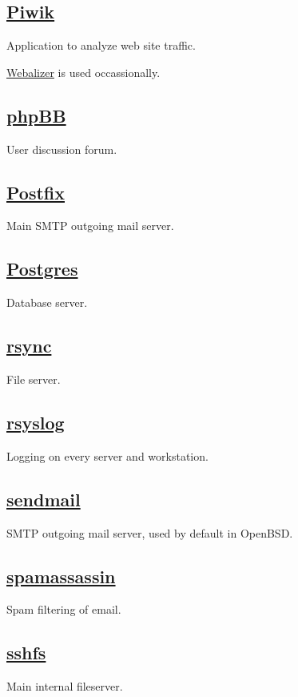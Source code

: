 \subsection{\href{https://www.piwiki.org/}{Piwik}}
Application to analyze web site traffic.

\href{http://www.mrunix.net/webalizer/}{Webalizer} is used occassionally.

\subsection{\href{https://www.phpbb.com/}{phpBB}}
User discussion forum.

\subsection{\href{http://www.postfix.org/}{Postfix}}
Main SMTP outgoing mail server.

\subsection{\href{http://www.postgresql.org/}{Postgres}}
Database server.

\subsection{\href{http://rsync.samba.org/}{rsync}}
File server.

\subsection{\href{http://www.rsyslog.com/}{rsyslog}}
Logging on every server and workstation.

\subsection{\href{http://www.openbsd.org/cgi-bin/man.cgi/OpenBSD-current/man8/sendmail.8?query=sendmail&sec=8}{sendmail}}
SMTP outgoing mail server, used by default in OpenBSD.

\subsection{\href{http://www.spamassassin.org/}{spamassassin}}
Spam filtering of email.

\subsection{\href{http://fuse.sourceforge.net/sshfs.html}{sshfs}}
Main internal fileserver.

